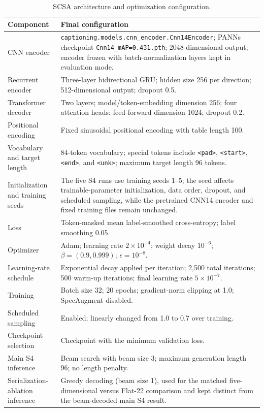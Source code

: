 \documentclass[10pt]{article}
\begin{document}
\begin{table}[h]
\centering
\caption{SCSA architecture and optimization configuration.}
\label{tab:scsa_config}
\scriptsize
\begin{tabular}{p{}p{}}
\toprule
Component & Final configuration \\
\midrule
CNN encoder & \texttt{captioning.models.cnn\_encoder.Cnn14Encoder}; PANNs checkpoint \texttt{Cnn14\_mAP=0.431.pth}; 2048-dimensional output; encoder frozen with batch-normalization layers kept in evaluation mode. \\
Recurrent encoder & Three-layer bidirectional GRU; hidden size 256 per direction; 512-dimensional output; dropout 0.5. \\
Transformer decoder & Two layers; model/token-embedding dimension 256; four attention heads; feed-forward dimension 1024; dropout 0.2. \\
Positional encoding & Fixed sinusoidal positional encoding with table length 100. \\
Vocabulary and target length & 84-token vocabulary; special tokens include \texttt{<pad>}, \texttt{<start>}, \texttt{<end>}, and \texttt{<unk>}; maximum target length 96 tokens. \\
Initialization and training seeds & The five S4 runs use training seeds 1--5; the seed affects trainable-parameter initialization, data order, dropout, and scheduled sampling, while the pretrained CNN14 encoder and fixed training files remain unchanged. \\
Loss & Token-masked mean label-smoothed cross-entropy; label smoothing 0.05. \\
Optimizer & Adam; learning rate $2\times10^{-4}$; weight decay $10^{-6}$; $\beta=(0.9,0.999)$; $\epsilon=10^{-8}$. \\
Learning-rate schedule & Exponential decay applied per iteration; 2,500 total iterations; 500 warm-up iterations; final learning rate $5\times10^{-7}$. \\
Training & Batch size 32; 20 epochs; gradient-norm clipping at 1.0; SpecAugment disabled. \\
Scheduled sampling & Enabled; linearly changed from 1.0 to 0.7 over training. \\
Checkpoint selection & Checkpoint with the minimum validation loss. \\
Main S4 inference & Beam search with beam size 3; maximum generation length 96; no length penalty. \\
Serialization-ablation inference & Greedy decoding (beam size 1), used for the matched five-dimensional versus Flat-22 comparison and kept distinct from the beam-decoded main S4 result. \\
\bottomrule
\end{tabular}
\end{table}
\end{document}
